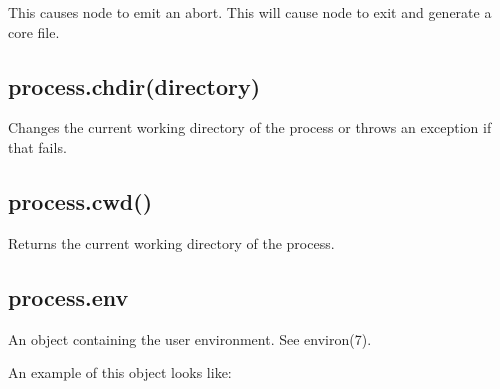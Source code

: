 This causes node to emit an abort. This will cause node to exit and
generate a core file.

\subsection{process.chdir(directory)}\label{process.chdirdirectory}

Changes the current working directory of the process or throws an
exception if that fails.

\begin{Shaded}
\begin{Highlighting}[]
\NormalTok{(} \NormalTok{+ }\NormalTok{());}
 \NormalTok{\{}
  \NormalTok{(}\NormalTok{);}
  \NormalTok{(} \NormalTok{+ }\NormalTok{());}
\NormalTok{\}}
 
  \NormalTok{(} 
\NormalTok{\}}
\end{Highlighting}
\end{Shaded}

\subsection{process.cwd()}\label{process.cwd}

Returns the current working directory of the process.

\begin{Shaded}
\begin{Highlighting}[]
\NormalTok{(} \NormalTok{+ }\NormalTok{());}
\end{Highlighting}
\end{Shaded}

\subsection{process.env}\label{process.env}

An object containing the user environment. See environ(7).

An example of this object looks like:

